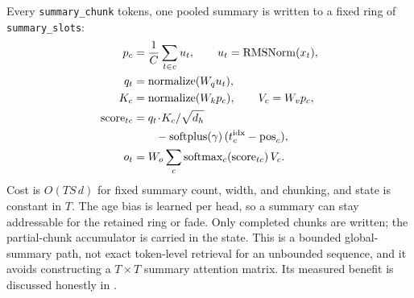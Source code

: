 Every \texttt{summary\_chunk} tokens, one pooled summary is written to a fixed ring of
\texttt{summary\_slots}:
\begin{equation}
\label{eq:summary}
\begin{aligned}
p_c&=\frac1C\sum_{t\in c}u_t,\qquad u_t=\mathrm{RMSNorm}(x_t),\\
q_t&=\mathrm{normalize}(W_qu_t),\\
K_c&=\mathrm{normalize}(W_kp_c),\qquad V_c=W_vp_c,\\
\mathrm{score}_{tc}&=q_t\!\cdot\!K_c/\sqrt{d_h}\\
&\qquad-\mathrm{softplus}(\gamma)\,(t_c^{\mathrm{idx}}-\mathrm{pos}_c),\\
o_t&=W_o\sum_c\operatorname{softmax}_c(\mathrm{score}_{tc})\,V_c .
\end{aligned}
\end{equation}
Cost is $O(TS\,d)$ for fixed summary count, width, and chunking, and state is constant in $T$.
The age bias is learned per head, so a summary can stay addressable for the retained ring or
fade. Only completed chunks are written; the partial-chunk accumulator is carried in the state.
This is a bounded global-summary path, not exact token-level retrieval for an unbounded sequence,
and it avoids constructing a $T\times T$ summary attention matrix. Its measured benefit is
discussed honestly in .
